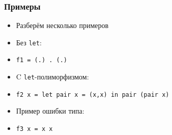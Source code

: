 \documentclass[11pt]{beamer}
\begin{document}
%

\begin{frame}[fragile]
  \frametitle{Примеры}
  \begin{itemize}
    \item Разберём несколько примеров
          \pause
    \item Без \lstinline|let|:
    \item[] \lstinline|f1 = (.) . (.)|
      \pause
    \item C \lstinline|let|-полиморфизмом:
    \item[] \lstinline|f2 x = let pair x = (x,x) in pair (pair x)|
      \pause
    \item Пример ошибки типа:
    \item[] \lstinline|f3 x = x x|
  \end{itemize}
\end{frame}
\end{document}

